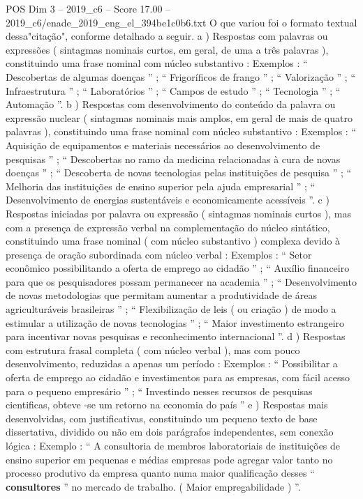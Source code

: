\begin{textsample}{POS Dim 3 – 2019\_c6 – Score 17.00 – 2019\_c6/enade\_2019\_eng\_el\_394be1c0b6.txt}
O que variou foi o formato textual dessa"citação", conforme detalhado a seguir. a ) Respostas com palavras ou expressões ( sintagmas nominais curtos, em geral, de uma a três palavras ), constituindo uma frase nominal com núcleo substantivo : Exemplos : “ Descobertas de algumas doenças ” ; “ Frigoríficos de frango ” ; “ Valorização ” ; “ Infraestrutura ” ; “ Laboratórios ” ; “ Campos de estudo ” ; “ Tecnologia ” ; “ Automação ”. b ) Respostas com desenvolvimento do conteúdo da palavra ou expressão nuclear ( sintagmas nominais mais amplos, em geral de mais de quatro palavras ), constituindo uma frase nominal com núcleo substantivo : Exemplos : “ Aquisição de equipamentos e materiais necessários ao desenvolvimento de pesquisas ” ; “ Descobertas no ramo da medicina relacionadas à cura de novas doenças ” ; “ Descoberta de novas tecnologias pelas instituições de pesquisa ” ; “ Melhoria das instituições de ensino superior pela ajuda empresarial ” ; “ Desenvolvimento de energias sustentáveis e economicamente acessíveis ”. c ) Respostas iniciadas por palavra ou expressão ( sintagmas nominais curtos ), mas com a presença de expressão verbal na complementação do núcleo sintático, constituindo uma frase nominal ( com núcleo substantivo ) complexa devido à presença de oração subordinada com núcleo verbal : Exemplos : “ Setor econômico possibilitando a oferta de emprego ao cidadão ” ; “ Auxílio financeiro para que os pesquisadores possam permanecer na academia ” ; “ Desenvolvimento de novas metodologias que permitam aumentar a produtividade de áreas agriculturáveis brasileiras ” ; “ Flexibilização de leis ( ou criação ) de modo a estimular a utilização de novas tecnologias ” ; “ Maior investimento estrangeiro para incentivar novas pesquisas e reconhecimento internacional ”. d ) Respostas com estrutura frasal completa ( com núcleo verbal ), mas com pouco desenvolvimento, reduzidas a apenas um período : Exemplos : “ Possibilitar a oferta de emprego ao cidadão e investimentos para as empresas, com fácil acesso para o pequeno empresário ” ; “ Investindo nesses recursos de pesquisas cientificas, obteve -se um retorno na economia do país ” e ) Respostas mais desenvolvidas, com justificativas, constituindo um pequeno texto de base dissertativa, dividido ou não em dois parágrafos independentes, sem conexão lógica : Exemplo : “ A consultoria de membros laboratoriais de instituições de ensino superior em pequenas e médias empresas pode agregar valor tanto no processo produtivo da empresa quanto numa maior qualificação desses “ \textbf{consultores} ” no mercado de trabalho. ( Maior empregabilidade ) ”.

\end{textsample}
